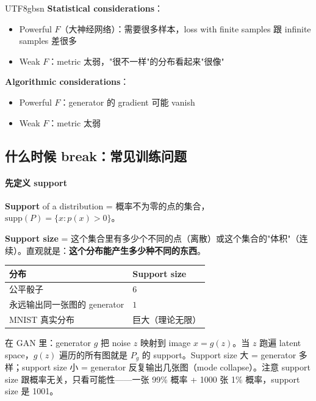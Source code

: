 \documentclass[11pt]{article}
\begin{document}
\begin{CJK}{UTF8}{gbsn}
\textbf{Statistical considerations}：
\begin{itemize}
  \item Powerful $F$（大神经网络）：需要很多样本，loss with finite samples 跟 infinite samples 差很多
  \item Weak $F$：metric 太弱，"很不一样"的分布看起来"很像"
\end{itemize}

\textbf{Algorithmic considerations}：
\begin{itemize}
  \item Powerful $F$：generator 的 gradient 可能 vanish
  \item Weak $F$：metric 太弱
\end{itemize}

\subsection{什么时候 break：常见训练问题}

\paragraph{先定义 support}

\textbf{Support} of a distribution = 概率不为零的点的集合，$\text{supp}(P) = \{x : p(x) > 0\}$。

\textbf{Support size} = 这个集合里有多少个不同的点（离散）或这个集合的"体积"（连续）。直观就是：\textbf{这个分布能产生多少种不同的东西}。

\begin{center}
\begin{tabular}{|l|l|}
\hline
分布 & Support size \\
\hline
公平骰子 & $6$ \\
永远输出同一张图的 generator & $1$ \\
MNIST 真实分布 & 巨大（理论无限） \\
\hline
\end{tabular}
\end{center}

在 GAN 里：generator $g$ 把 noise $z$ 映射到 image $x = g(z)$。当 $z$ 跑遍 latent space，$g(z)$ 遍历的所有图就是 $P_g$ 的 support。Support size 大 = generator 多样；support size 小 = generator 反复输出几张图（mode collapse）。注意 support size 跟概率无关，只看可能性——一张 99\% 概率 + 1000 张 1\% 概率，support size 是 1001。


\end{CJK}
\end{document}

